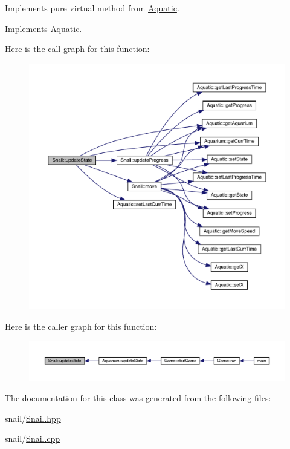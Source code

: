 Implements pure virtual method from \mbox{\hyperlink{class_aquatic}{Aquatic}}. 



Implements \mbox{\hyperlink{class_aquatic_a51e44c95476d72a841fea667c6cbbedc}{Aquatic}}.

Here is the call graph for this function\+:\nopagebreak
\begin{figure}[H]
\begin{center}
\leavevmode
\includegraphics[width=350pt]{class_snail_a46dbefb10308c29341d96423e853cb2b_cgraph}
\end{center}
\end{figure}
Here is the caller graph for this function\+:\nopagebreak
\begin{figure}[H]
\begin{center}
\leavevmode
\includegraphics[width=350pt]{class_snail_a46dbefb10308c29341d96423e853cb2b_icgraph}
\end{center}
\end{figure}


The documentation for this class was generated from the following files\+:\begin{DoxyCompactItemize}
\item 
snail/\mbox{\hyperlink{_snail_8hpp}{Snail.\+hpp}}\item 
snail/\mbox{\hyperlink{_snail_8cpp}{Snail.\+cpp}}\end{DoxyCompactItemize}
